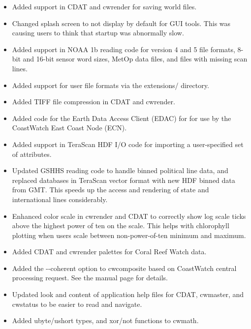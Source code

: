 \begin{itemize}
  \item Added support in CDAT and cwrender for saving world
  files.

  \item Changed splash screen to not display by default for GUI
  tools.  This was causing users to think that startup was
  abnormally slow.

  \item Added support in NOAA 1b reading code for version 4 and 5
  file formats, 8-bit and 16-bit sensor word sizes, MetOp data
  files, and files with missing scan lines.

  \item Added support for user file formats via the extensions/
  directory.

  \item Added TIFF file compression in CDAT and cwrender.

  \item Added code for the Earth Data Access Client (EDAC) for
  for use by the CoastWatch East Coast Node (ECN).

  \item Added support in TeraScan HDF I/O code for importing a
  user-specified set of attributes.

  \item Updated GSHHS reading code to handle binned political
  line data, and replaced databases in TeraScan vector format
  with new HDF binned data from GMT.  This speeds up the access
  and rendering of state and international lines considerably.

  \item Enhanced color scale in cwrender and CDAT to correctly
  show log scale ticks above the highest power of ten on the
  scale.  This helps with chlorophyll plotting when users scale
  between non-power-of-ten minimum and maximum.

  \item Added CDAT and cwrender palettes for Coral Reef Watch
  data.

  \item Added the {-}-coherent option to cwcomposite based on
  CoastWatch central processing request.  See the manual page for
  details.

  \item Updated look and content of application help files for
  CDAT, cwmaster, and cwstatus to be easier to read and navigate.

  \item Added ubyte/ushort types, and xor/not functions to
  cwmath.


\end{itemize}

